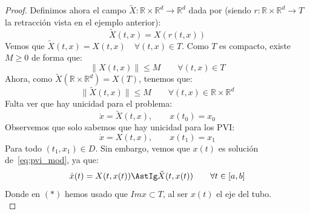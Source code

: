 \begin{proof}
    \noindent
    Definimos ahora el campo $\tilde{X}:\mathbb{R}\times \mathbb{R}^d\to \mathbb{R}^d$ dada por (siendo $r:\mathbb{R}\times\mathbb{R}^d\to T$ la retracción vista en el ejemplo anterior):
    \begin{equation*}
        \tilde{X}(t,x) = X(r(t,x))
    \end{equation*}
    Vemos que $\tilde{X}(t,x) = X(t,x)\quad \forall (t,x)\in T$. Como $T$ es compacto, existe $M\geq 0$ de forma que:
    \begin{equation*}
        \|X(t,x)\| \leq M \qquad \forall (t,x)\in T
    \end{equation*}
    Ahora, como $\tilde{X}(\mathbb{R}\times \mathbb{R}^d)= X(T)$, tenemos que:
    \begin{equation*}
        \|\tilde{X}(t,x)\|\leq M \qquad \forall (t,x)\in \mathbb{R}\times \mathbb{R}^d
    \end{equation*}
    Falta ver que hay unicidad para el problema:
    \begin{equation}\label{eq:pvi_mod}
        \dot{x} = \tilde{X}(t,x),\qquad x(t_0) = x_0
    \end{equation}
    Observemos que solo sabemos que hay unicidad para los PVI:
    \begin{equation*}
        \dot{x} = X(t,x),\qquad x(t_1) = x_1
    \end{equation*}
    Para todo $(t_1,x_1)\in D$. Sin embargo, vemos que $x(t)$ es solución de~\eqref{eq:pvi_mod}, ya que:
    \begin{equation*}
        \dot{x}(t) = X(t,x(t)) \AstIg \tilde{X}(t,x(t)) \qquad \forall t\in [a,b]
    \end{equation*}
    Donde en $(\ast)$ hemos usado que $Im x \subset T$, al ser $x(t)$ el eje del tubo.\\


\end{proof}

